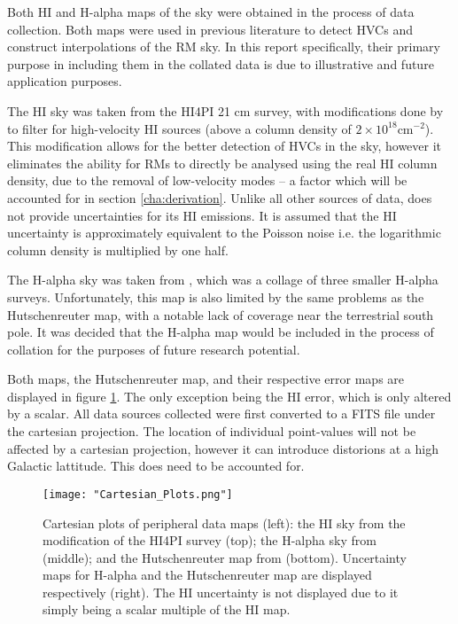 Both HI and H-alpha maps of the sky were obtained in the process of data collection. Both maps were used in previous literature to detect HVCs and construct interpolations of the RM sky. In this report specifically, their primary purpose in including them in the collated data is due to illustrative and future application purposes. 


The HI sky was taken from the HI4PI 21 cm survey, with modifications done by \cite{ID6} to filter for high-velocity HI sources (above a column density of $2\times 10^{18} \mathrm{cm}^{-2}$). This modification allows for the better detection of HVCs in the sky, however it eliminates the ability for RMs to directly be analysed using the real HI column density, due to the removal of low-velocity modes – a factor which will be accounted for in section \ref{cha:derivation}. Unlike all other sources of data, \cite{ID6} does not provide uncertainties for its HI emissions. It is assumed that the HI uncertainty is approximately equivalent to the Poisson noise i.e. the logarithmic column density is multiplied by one half.


The H-alpha sky was taken from \cite{ID43}, which was a collage of three smaller H-alpha surveys. Unfortunately, this map is also limited by the same problems as the Hutschenreuter map, with a notable lack of coverage near the terrestrial south pole. It was decided that the H-alpha map would be included in the process of collation for the purposes of future research potential.


Both maps, the Hutschenreuter map, and their respective error maps are displayed in figure \ref{fig:maps}. The only exception being the HI error, which is only altered by a scalar. All data sources collected were first converted to a FITS file under the cartesian projection. The location of individual point-values will not be affected by a cartesian projection, however it can introduce distorions at a high Galactic lattitude. This does need to be accounted for.

\begin{figure}
    \texttt{[image: "Cartesian\_Plots.png"]}
    \centering
    \caption{Cartesian plots of peripheral data maps (left): the HI sky from the \cite{ID6} modification of the HI4PI survey (top); the H-alpha sky from \cite{ID43} (middle); and the Hutschenreuter map from \cite{ID44, ID45} (bottom). Uncertainty maps for H-alpha and the Hutschenreuter map are displayed respectively (right). The HI uncertainty is not displayed due to it simply being a scalar multiple of the HI map.}
    \label{fig:maps}
\end{figure}

